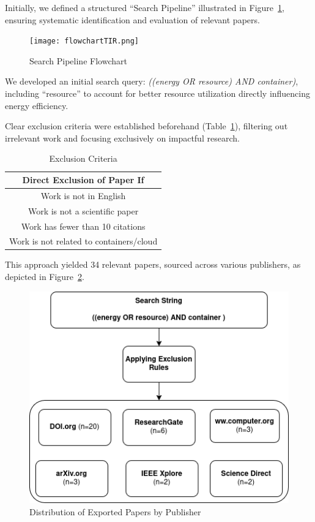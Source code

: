 \documentclass[runningheads]{llncs}
\begin{document}
Initially, we defined a structured ``Search Pipeline'' illustrated in Figure~\ref{fig:search_pipeline}, ensuring systematic identification and evaluation of relevant papers.

\begin{figure}[H]
    \centering
    \texttt{[image: flowchartTIR.png]}
    \caption{Search Pipeline Flowchart}\label{fig:search_pipeline}
\end{figure}

We developed an initial search query: \textit{((energy OR resource) AND container)}, including ``resource'' to account for better resource utilization directly influencing energy efficiency.

Clear exclusion criteria were established beforehand (Table~\ref{tab:Exclusion Rules}), filtering out irrelevant work and focusing exclusively on impactful research.
\begin{table}[H]
\centering
\begin{tabular}{c}
\hline
Direct Exclusion of Paper If \\ \hline
Work is not in English \\ 
Work is not a scientific paper \\ 
Work has fewer than 10 citations \\ 
Work is not related to containers/cloud \\ \hline
\end{tabular}
    \caption{Exclusion Criteria}
    \label{tab:Exclusion Rules}
\end{table}

This approach yielded 34 relevant papers, sourced across various publishers, as depicted in Figure~\ref{fig:exported_papers}.

\begin{figure}[H]
    \centering
    \includegraphics[width=0.8\columnwidth]{exportedPapers.png}
    \caption{Distribution of Exported Papers by Publisher}\label{fig:exported_papers}
\end{figure}
\end{document}
